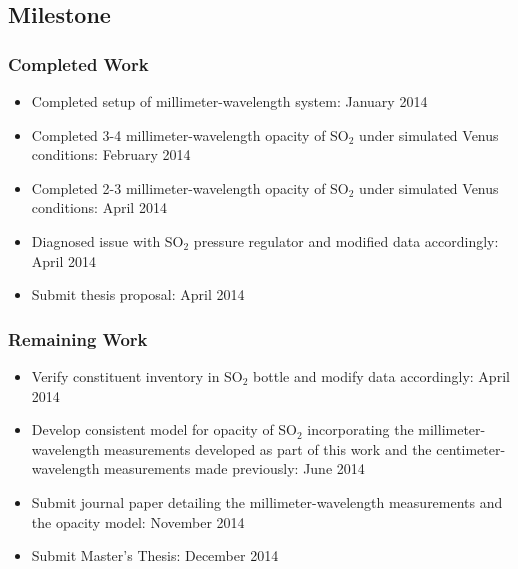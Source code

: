 \subsection{Milestone}

\subsubsection*{Completed Work}
\begin{itemize}
\item Completed setup of millimeter-wavelength system: January 2014
\item Completed 3-4 millimeter-wavelength opacity of SO$_2$ under simulated Venus conditions: February 2014
\item Completed 2-3 millimeter-wavelength opacity of SO$_2$ under simulated Venus conditions: April 2014
\item Diagnosed issue with SO$_2$ pressure regulator and modified data accordingly: April 2014
\item Submit thesis proposal: April 2014
\end{itemize}
\enlargethispage{\baselineskip}
\subsubsection*{Remaining Work}
\begin{itemize}
\item Verify constituent inventory in SO$_2$ bottle and modify data accordingly: April 2014
\item Develop consistent model for opacity of SO$_2$ incorporating the millimeter-wavelength measurements developed as part of this work and the centimeter-wavelength measurements made previously: June 2014
\item Submit journal paper detailing the millimeter-wavelength measurements and the opacity model: November 2014
\item Submit Master's Thesis: December 2014
\end{itemize}